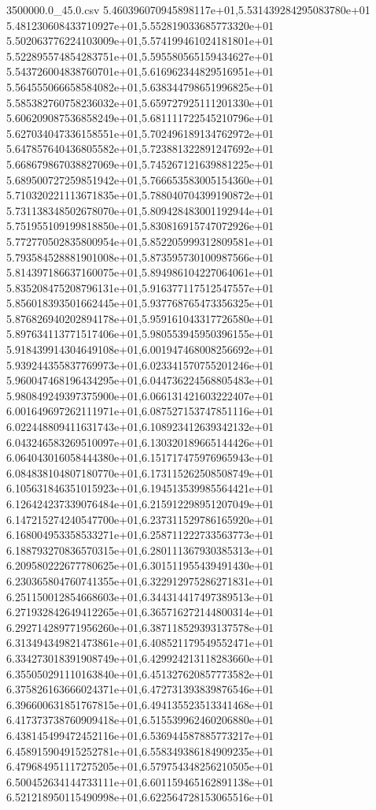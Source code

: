 \begin{filecontents*}{3500000.0_45.0.csv}
5.460396070945898117e+01,5.531439284295083780e+01
5.481230608433710927e+01,5.552819033685773320e+01
5.502063776224103009e+01,5.574199461024181801e+01
5.522895574854283751e+01,5.595580565159434627e+01
5.543726004838760701e+01,5.616962344829516951e+01
5.564555066658584082e+01,5.638344798651996825e+01
5.585382760758236032e+01,5.659727925111201330e+01
5.606209087536858249e+01,5.681111722545210796e+01
5.627034047336158551e+01,5.702496189134762972e+01
5.647857640436805582e+01,5.723881322891247692e+01
5.668679867038827069e+01,5.745267121639881225e+01
5.689500727259851942e+01,5.766653583005154360e+01
5.710320221113671835e+01,5.788040704399190872e+01
5.731138348502678070e+01,5.809428483001192944e+01
5.751955109199818850e+01,5.830816915747072926e+01
5.772770502835800954e+01,5.852205999312809581e+01
5.793584528881901008e+01,5.873595730100987566e+01
5.814397186637160075e+01,5.894986104227064061e+01
5.835208475208796131e+01,5.916377117512547557e+01
5.856018393501662445e+01,5.937768765473356325e+01
5.876826940202894178e+01,5.959161043317726580e+01
5.897634113771517406e+01,5.980553945950396155e+01
5.918439914304649108e+01,6.001947468008256692e+01
5.939244355837769973e+01,6.023341570755201246e+01
5.960047468196434295e+01,6.044736224568805483e+01
5.980849249397375900e+01,6.066131421603222407e+01
6.001649697262111971e+01,6.087527153747851116e+01
6.022448809411631743e+01,6.108923412639342132e+01
6.043246583269510097e+01,6.130320189665144426e+01
6.064043016058444380e+01,6.151717475976965943e+01
6.084838104807180770e+01,6.173115262508508749e+01
6.105631846351015923e+01,6.194513539985564421e+01
6.126424237339076484e+01,6.215912298951207049e+01
6.147215274240547700e+01,6.237311529786165920e+01
6.168004953358533271e+01,6.258711222733563773e+01
6.188793270836570315e+01,6.280111367930385313e+01
6.209580222677780625e+01,6.301511955439491430e+01
6.230365804760741355e+01,6.322912975286271831e+01
6.251150012854668603e+01,6.344314417497389513e+01
6.271932842649412265e+01,6.365716272144800314e+01
6.292714289771956260e+01,6.387118529393137578e+01
6.313494349821473861e+01,6.408521179549552471e+01
6.334273018391908749e+01,6.429924213118283660e+01
6.355050291110163840e+01,6.451327620857773582e+01
6.375826163666024371e+01,6.472731393839876546e+01
6.396600631851767815e+01,6.494135523513341468e+01
6.417373738760909418e+01,6.515539962460206880e+01
6.438145499472452116e+01,6.536944587885773217e+01
6.458915904915252781e+01,6.558349386184909235e+01
6.479684951117275205e+01,6.579754348256210505e+01
6.500452634144733111e+01,6.601159465162891138e+01
6.521218950115490998e+01,6.622564728153065516e+01

\end{filecontents*}
